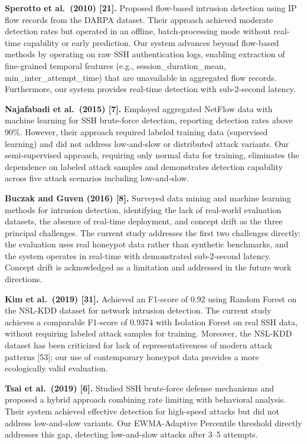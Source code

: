 \documentclass[
  a4paper]{report}
\begin{document}
\textbf{Sperotto et al.~(2010) {[}21{]}.} Proposed flow-based intrusion
detection using IP flow records from the DARPA dataset. Their approach
achieved moderate detection rates but operated in an offline,
batch-processing mode without real-time capability or early prediction.
Our system advances beyond flow-based methods by operating on raw SSH
authentication logs, enabling extraction of fine-grained temporal
features (e.g., session\_duration\_mean, min\_inter\_attempt\_time) that
are unavailable in aggregated flow records. Furthermore, our system
provides real-time detection with sub-2-second latency.

\textbf{Najafabadi et al.~(2015) {[}7{]}.} Employed aggregated NetFlow
data with machine learning for SSH brute-force detection, reporting
detection rates above 90\%. However, their approach required labeled
training data (supervised learning) and did not address low-and-slow or
distributed attack variants. Our semi-supervised approach, requiring
only normal data for training, eliminates the dependence on labeled
attack samples and demonstrates detection capability across five attack
scenarios including low-and-slow.

\textbf{Buczak and Guven (2016) {[}8{]}.} Surveyed data mining and
machine learning methods for intrusion detection, identifying the lack
of real-world evaluation datasets, the absence of real-time deployment,
and concept drift as the three principal challenges. The current study
addresses the first two challenges directly: the evaluation uses real
honeypot data rather than synthetic benchmarks, and the system operates
in real-time with demonstrated sub-2-second latency. Concept drift is
acknowledged as a limitation and addressed in the future work
directions.

\textbf{Kim et al.~(2019) {[}31{]}.} Achieved an F1-score of 0.92 using
Random Forest on the NSL-KDD dataset for network intrusion detection.
The current study achieves a comparable F1-score of 0.9374 with
Isolation Forest on real SSH data, without requiring labeled attack
samples for training. Moreover, the NSL-KDD dataset has been criticized
for lack of representativeness of modern attack patterns {[}53{]}; our
use of contemporary honeypot data provides a more ecologically valid
evaluation.

\textbf{Tsai et al.~(2019) {[}6{]}.} Studied SSH brute-force defense
mechanisms and proposed a hybrid approach combining rate limiting with
behavioral analysis. Their system achieved effective detection for
high-speed attacks but did not address low-and-slow variants. Our
EWMA-Adaptive Percentile threshold directly addresses this gap,
detecting low-and-slow attacks after 3--5 attempts.
\end{document}
